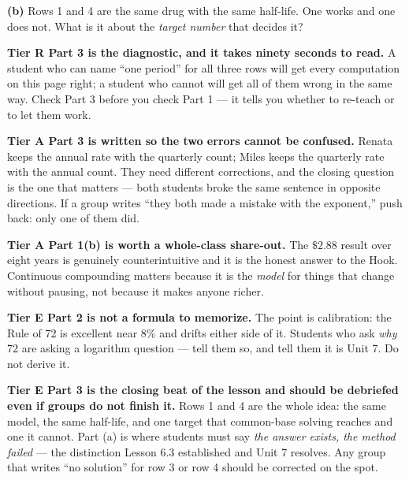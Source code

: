 \documentclass[10pt]{article}
\begin{document}
\begin{tcolorbox}[colback=white, colframe=black!40, title=\textbf{Tier E --- Extension},
    fonttitle=\bfseries, arc=1.5mm, left=3mm, right=3mm, top=2mm, bottom=2mm, breakable]
\vspace{2pt}
\textbf{(b)} Rows 1 and 4 are the same drug with the same half-life. One works and one does not. What
is it about the \emph{target number} that decides it?
\end{tcolorbox}

\begin{teachernote}
\textbf{Tier R Part 3 is the diagnostic, and it takes ninety seconds to read.} A student who can name
``one period'' for all three rows will get every computation on this page right; a student who cannot
will get all of them wrong in the same way. Check Part 3 before you check Part 1 --- it tells you
whether to re-teach or to let them work.

\textbf{Tier A Part 3 is written so the two errors cannot be confused.} Renata keeps the annual rate
with the quarterly count; Miles keeps the quarterly rate with the annual count. They need different
corrections, and the closing question is the one that matters --- both students broke the same sentence
in opposite directions. If a group writes ``they both made a mistake with the exponent,'' push back:
only one of them did.

\textbf{Tier A Part 1(b) is worth a whole-class share-out.} The $\$2.88$ result over eight years is
genuinely counterintuitive and it is the honest answer to the Hook. Continuous compounding matters
because it is the \emph{model} for things that change without pausing, not because it makes anyone
richer.

\textbf{Tier E Part 2 is not a formula to memorize.} The point is calibration: the Rule of 72 is
excellent near $8\%$ and drifts either side of it. Students who ask \emph{why} $72$ are asking a
logarithm question --- tell them so, and tell them it is Unit 7. Do not derive it.

\textbf{Tier E Part 3 is the closing beat of the lesson and should be debriefed even if groups do not
finish it.} Rows 1 and 4 are the whole idea: the same model, the same half-life, and one target that
common-base solving reaches and one it cannot. Part (a) is where students must say \emph{the answer
exists, the method failed} --- the distinction Lesson 6.3 established and Unit 7 resolves. Any group
that writes ``no solution'' for row 3 or row 4 should be corrected on the spot.
\end{teachernote}
\end{document}
